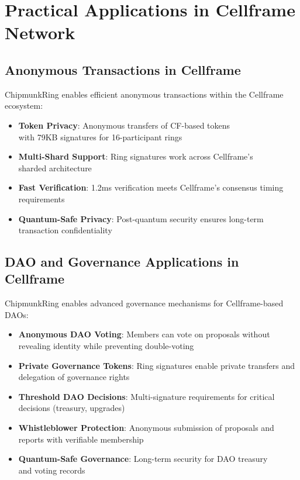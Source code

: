 \documentclass[11pt,a4paper]{article}
\begin{document}
\section{Practical Applications in Cellframe Network}

\subsection{Anonymous Transactions in Cellframe}

ChipmunkRing enables efficient anonymous transactions within the Cellframe ecosystem:
\begin{itemize}
\item \textbf{Token Privacy}: Anonymous transfers of CF-based tokens \\
with 79KB signatures for 16-participant rings
\item \textbf{Multi-Shard Support}: Ring signatures work across Cellframe's \\
sharded architecture
\item \textbf{Fast Verification}: 1.2ms verification meets Cellframe's consensus timing requirements
\item \textbf{Quantum-Safe Privacy}: Post-quantum security ensures long-term transaction confidentiality
\end{itemize}

\subsection{DAO and Governance Applications in Cellframe}

ChipmunkRing enables advanced governance mechanisms for Cellframe-based DAOs:
\begin{itemize}
\item \textbf{Anonymous DAO Voting}: Members can vote on proposals without revealing identity while preventing double-voting
\item \textbf{Private Governance Tokens}: Ring signatures enable private transfers and delegation of governance rights
\item \textbf{Threshold DAO Decisions}: Multi-signature requirements for critical decisions (treasury, upgrades)
\item \textbf{Whistleblower Protection}: Anonymous submission of proposals and reports with verifiable membership
\item \textbf{Quantum-Safe Governance}: Long-term security for DAO treasury \\
and voting records
\end{itemize}
\end{document}
